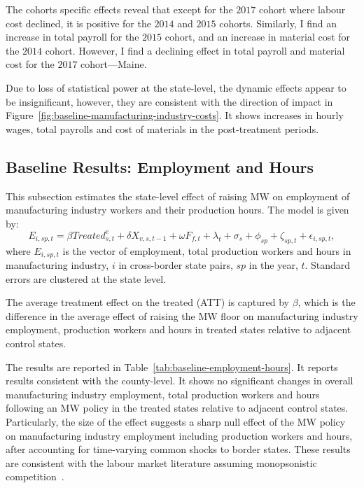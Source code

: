 \documentclass[numsec,webpdf,contemporary,large,namedate]{oup-authoring-template}%
\begin{document}
    The cohorts specific effects reveal that except for the $2017$ cohort where labour cost declined, it is positive for the $2014$ and $2015$ cohorts. Similarly, I find an increase in total payroll for the $2015$ cohort, and an increase in material cost for the $2014$ cohort. However, I find a declining effect in total payroll and material cost for the $2017$ cohort---Maine.
    
    

    Due to loss of statistical power at the state-level, the dynamic effects appear to be insignificant, however, they are consistent with the direction of impact in Figure~\ref{fig:baseline-manufacturing-industry-costs}. It shows increases in hourly wages, total payrolls and cost of materials in the post-treatment periods.

    \subsection{Baseline Results: Employment and Hours}\label{subsec:baseline-results-employment-and-hours}
    This subsection estimates the state-level effect of raising MW on employment of manufacturing industry workers and their production hours. The model is given by:
    \begin{equation}
        E_{i,sp,t} = \beta Treated_{s,t}^e + \delta X_{v,s,t-1} + \omega F_{f,t} + \lambda_{t} + \sigma_{s} + \phi_{sp} + \zeta_{sp,t} + \epsilon_{i,sp,t},\label{eq:baseline-emp-hours}
    \end{equation}
    where $E_{i,sp,t}$ is the vector of employment, total production workers and hours in manufacturing industry, $i$ in cross-border state pairs, $sp$ in the year, $t$. Standard errors are clustered at the state level.
    

    The average treatment effect on the treated (ATT) is captured by $\beta$, which is the difference in the average effect of raising the MW floor on manufacturing industry employment, production workers and hours in treated states relative to adjacent control states.

    The results are reported in Table~\ref{tab:baseline-employment-hours}. It reports results consistent with the county-level. It shows no significant changes in overall manufacturing industry employment, total production workers and hours following an MW policy in the treated states relative to adjacent control states. Particularly, the size of the effect suggests a sharp null effect of the MW policy on manufacturing industry employment including production workers and hours, after accounting for time-varying common shocks to border states. These results are consistent with the labour market literature assuming monopsonistic competition~\citep{card2000minimum, aaronson2018industry, cengiz2019effect, wong2019minimum, dustmann2022reallocation}.
\end{document}
